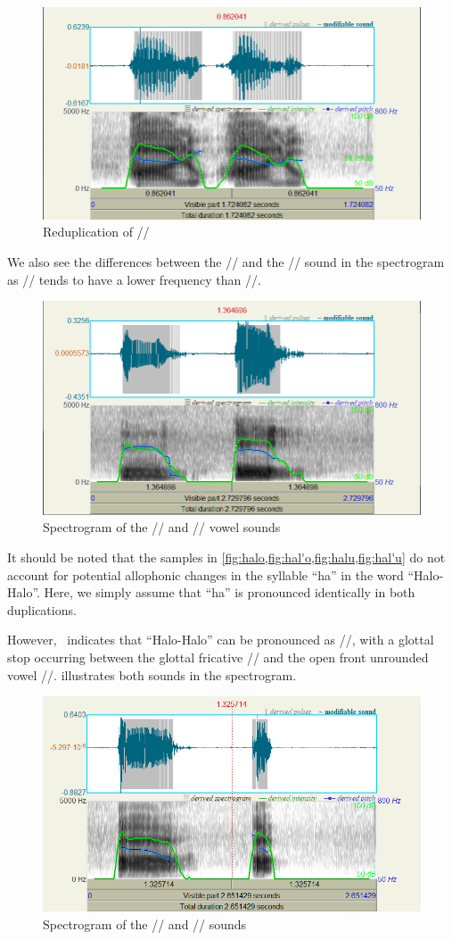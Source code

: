 \documentclass{article}
\begin{document}
	\begin{figure}
		\centering
		\includegraphics[width=0.65\linewidth]{img/hal_u.png}
		\caption{Reduplication of //}\label{fig:hal'u}
	\end{figure}
	
	We also see the differences between the // and the //
	sound in the spectrogram as // tends to have a lower frequency than
	//.
	
	\begin{figure}
		\centering
		\includegraphics[width=0.65\linewidth]{img/u-o.png}
		\caption{Spectrogram of the // and // vowel sounds}\label{fig:u-o}
	\end{figure}
	
	It should be noted that the samples in
	\cref{fig:halo,fig:hal'o,fig:halu,fig:hal'u} do not account for potential
	allophonic changes in the syllable ``ha'' in the word ``Halo-Halo''. Here, we
	simply assume that ``ha'' is pronounced identically in both duplications.
	
	However,~\cite{KWF2015} indicates that ``Halo-Halo'' can be pronounced as
	//, with a glottal stop occurring between the glottal
	fricative // and the open front unrounded vowel //.
	 illustrates both sounds in the spectrogram.
	
	\begin{figure}
		\centering
		\includegraphics[width=0.65\linewidth]{img/a-a_.png}
		\caption{Spectrogram of the // and // sounds}\label{fig:a-a'}
	\end{figure}
	
\end{document}
